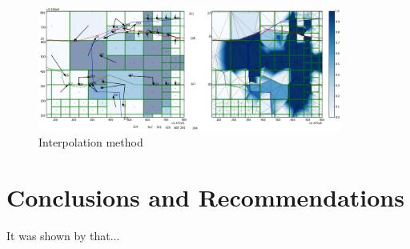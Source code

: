 \documentclass[a4paper]{article}
\begin{document}
\begin{figure}[h]
\centering
\includegraphics[width=10cm]{interpolationlevees2}
\caption{Interpolation method}
\label{fig1}
\end{figure}



\section{Conclusions and Recommendations}


It was shown by \citet{berry:teomowcihbsi} that...



\end{document}
